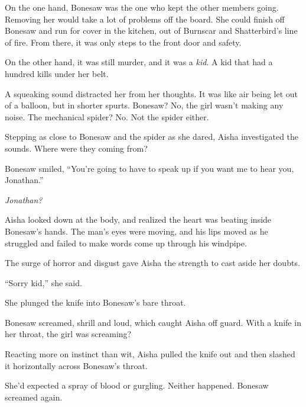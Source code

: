 On the one hand, Bonesaw was the one who kept the other members going.  Removing her would take a lot of problems off the board.  She could finish off Bonesaw and run for cover in the kitchen, out of Burnscar and Shatterbird's line of fire.  From there, it was only steps to the front door and safety.



On the other hand, it was still murder, and it was a \emph{kid}.  A kid that had a hundred kills under her belt.



A squeaking sound distracted her from her thoughts.  It was like air being let out of a balloon, but in shorter spurts.  Bonesaw?  No, the girl wasn't making any noise.  The mechanical spider?  No.  Not the spider either.



Stepping as close to Bonesaw and the spider as she dared, Aisha investigated the sounds.  Where were they coming from?



Bonesaw smiled, ``You're going to have to speak up if you want me to hear you, Jonathan.''



\emph{Jonathan?}



Aisha looked down at the body, and realized the heart was beating inside Bonesaw's hands.  The man's eyes were moving, and his lips moved as he struggled and failed to make words come up through his windpipe.



The surge of horror and disgust gave Aisha the strength to cast aside her doubts.



``Sorry kid,'' she said.



She plunged the knife into Bonesaw's bare throat.



Bonesaw screamed, shrill and loud, which caught Aisha off guard.  With a knife in her throat, the girl was screaming?



Reacting more on instinct than wit, Aisha pulled the knife out and then slashed it horizontally across Bonesaw's throat.



She'd expected a spray of blood or gurgling.  Neither happened.  Bonesaw screamed again.



